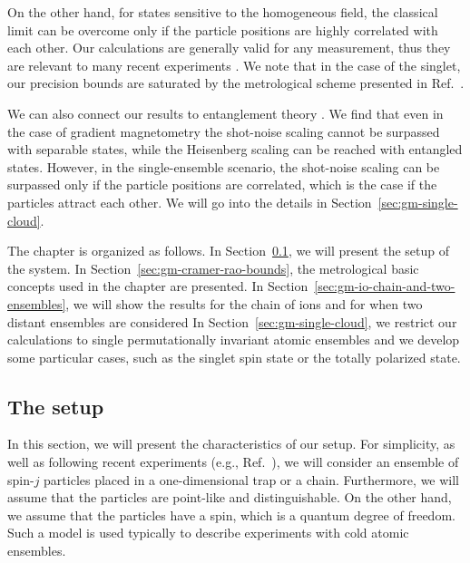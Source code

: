 On the other hand, for states sensitive to the homogeneous field, the classical limit can be overcome only if the particle positions are highly correlated with each other.
Our calculations are generally valid for any measurement, thus they are relevant to many recent experiments \cite{Wasilewski2010,Eckert2006,Wildermuth2006, Wolfgramm2010,Koschorreck2011,Vengalattore2007,Zhou2010,Behbood2013}.
We note that in the case of the singlet, our precision bounds are saturated by the metrological scheme presented in Ref.~\cite{Urizar-Lanz2013}.

We can also connect our results to entanglement theory \cite{Werner1989,Horodecki2009,Guehne2009}.
We find that even in the case of gradient magnetometry the shot-noise scaling cannot be surpassed with separable states, while the Heisenberg scaling can be reached with entangled states.
However, in the single-ensemble scenario, the shot-noise scaling can be surpassed only if the particle positions are correlated, which is the case if the particles attract each other.
We will go into the details in Section~\ref{sec:gm-single-cloud}.

The chapter is organized as follows. In Section~\ref{sec:gm-the-setup}, we will present the setup of the system.
In Section~\ref{sec:gm-cramer-rao-bounds}, the metrological basic concepts used in the chapter are presented.
In Section~\ref{sec:gm-io-chain-and-two-ensembles}, we will show the results for the chain of ions and for when two distant ensembles are considered
In Section~\ref{sec:gm-single-cloud}, we restrict our calculations to single permutationally invariant atomic ensembles and we develop some particular cases, such as the singlet spin state or the totally polarized state.

\subsection{The setup}
\label{sec:gm-the-setup}

In this section, we will present the characteristics of our setup.
For simplicity, as well as following  recent experiments (e.g., Ref.~\cite{Koschorreck2011}), we will consider an ensemble of spin-$j$ particles placed in a one-dimensional trap or a chain.
Furthermore, we will assume that the particles are point-like and distinguishable.
On the other hand, we assume that the particles have a spin, which is a quantum degree of freedom.
Such a model is used typically to describe experiments with cold atomic ensembles.

